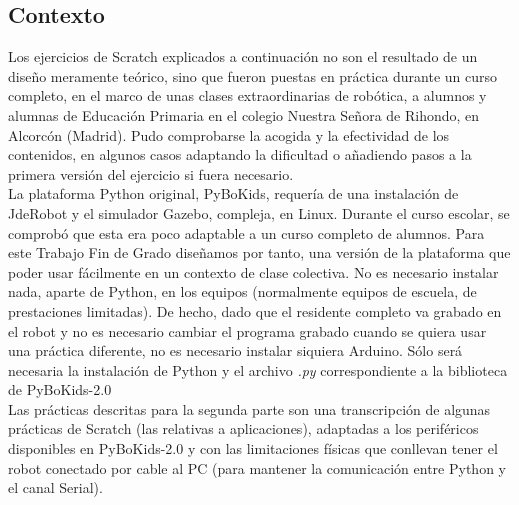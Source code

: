 \subsection{Contexto}\label{subsec:contexto}
Los ejercicios de Scratch explicados a continuación no son el resultado de un diseño meramente teórico, sino que fueron puestas en práctica durante un curso completo, en el marco de unas clases extraordinarias de robótica, a alumnos y alumnas de Educación Primaria en el colegio Nuestra Señora de Rihondo, en Alcorcón (Madrid). Pudo comprobarse la acogida y la efectividad de los contenidos, en algunos casos adaptando la dificultad o añadiendo pasos a la primera versión del ejercicio si fuera necesario. \\
La plataforma Python original, PyBoKids\cite{JdeRobot}, requería de una instalación de JdeRobot y el simulador Gazebo, compleja, en Linux. Durante el curso escolar, se comprobó que esta era poco adaptable a un curso  completo de alumnos. Para este Trabajo Fin de Grado diseñamos por tanto, una versión de la plataforma que poder usar fácilmente en un contexto de clase colectiva. No es necesario instalar nada, aparte de Python, en los equipos (normalmente equipos de escuela, de prestaciones limitadas). De hecho, dado que el residente completo va grabado en el robot y no es necesario cambiar el programa grabado cuando se quiera usar una práctica diferente, no es necesario instalar siquiera Arduino. Sólo será necesaria la instalación de Python y el archivo \textit{.py} correspondiente a la biblioteca de PyBoKids-2.0 \\
Las prácticas descritas para la segunda parte son una transcripción de algunas prácticas de Scratch (las relativas a aplicaciones), adaptadas a los periféricos disponibles en PyBoKids-2.0 y con las limitaciones físicas que conllevan tener el robot conectado por cable al PC (para mantener la comunicación entre Python y el canal Serial). 


